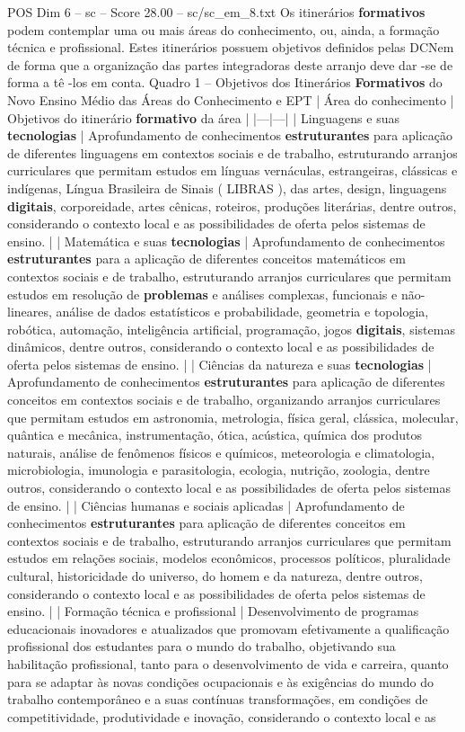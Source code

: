 \begin{textsample}{POS Dim 6 – sc – Score 28.00 – sc/sc\_em\_8.txt}
Os itinerários \textbf{formativos} podem contemplar uma ou mais áreas do conhecimento, ou, ainda, a formação técnica e profissional.
Estes itinerários possuem objetivos definidos pelas DCNem de forma que a organização das partes integradoras deste arranjo deve dar -se de forma a tê -los em conta.
Quadro 1 – Objetivos dos Itinerários \textbf{Formativos} do Novo Ensino Médio das Áreas do Conhecimento e EPT | Área do conhecimento | Objetivos do itinerário \textbf{formativo} da área | |---|---| | Linguagens e suas \textbf{tecnologias} | Aprofundamento de conhecimentos \textbf{estruturantes} para aplicação de diferentes linguagens em contextos sociais e de trabalho, estruturando arranjos curriculares que permitam estudos em línguas vernáculas, estrangeiras, clássicas e indígenas, Língua Brasileira de Sinais ( LIBRAS ), das artes, design, linguagens \textbf{digitais}, corporeidade, artes cênicas, roteiros, produções literárias, dentre outros, considerando o contexto local e as possibilidades de oferta pelos sistemas de ensino. | | Matemática e suas \textbf{tecnologias} | Aprofundamento de conhecimentos \textbf{estruturantes} para a aplicação de diferentes conceitos matemáticos em contextos sociais e de trabalho, estruturando arranjos curriculares que permitam estudos em resolução de \textbf{problemas} e análises complexas, funcionais e não-lineares, análise de dados estatísticos e probabilidade, geometria e topologia, robótica, automação, inteligência artificial, programação, jogos \textbf{digitais}, sistemas dinâmicos, dentre outros, considerando o contexto local e as possibilidades de oferta pelos sistemas de ensino. | | Ciências da natureza e suas \textbf{tecnologias} | Aprofundamento de conhecimentos \textbf{estruturantes} para aplicação de diferentes conceitos em contextos sociais e de trabalho, organizando arranjos curriculares que permitam estudos em astronomia, metrologia, física geral, clássica, molecular, quântica e mecânica, instrumentação, ótica, acústica, química dos produtos naturais, análise de fenômenos físicos e químicos, meteorologia e climatologia, microbiologia, imunologia e parasitologia, ecologia, nutrição, zoologia, dentre outros, considerando o contexto local e as possibilidades de oferta pelos sistemas de ensino. | | Ciências humanas e sociais aplicadas | Aprofundamento de conhecimentos \textbf{estruturantes} para aplicação de diferentes conceitos em contextos sociais e de trabalho, estruturando arranjos curriculares que permitam estudos em relações sociais, modelos econômicos, processos políticos, pluralidade cultural, historicidade do universo, do homem e da natureza, dentre outros, considerando o contexto local e as possibilidades de oferta pelos sistemas de ensino. | | Formação técnica e profissional | Desenvolvimento de programas educacionais inovadores e atualizados que promovam efetivamente a qualificação profissional dos estudantes para o mundo do trabalho, objetivando sua habilitação profissional, tanto para o desenvolvimento de vida e carreira, quanto para se adaptar às novas condições ocupacionais e às exigências do mundo do trabalho contemporâneo e a suas contínuas transformações, em condições de competitividade, produtividade e inovação, considerando o contexto local e as 
\end{textsample}
